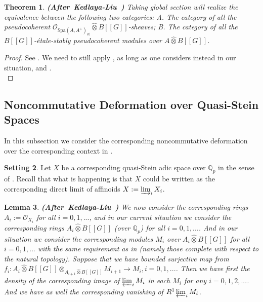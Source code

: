 \documentclass[12pt]{amsart}
\newtheorem{theorem}{Theorem}[section]
\newtheorem{lemma}[theorem]{Lemma}
\theoremstyle{definition}
\numberwithin{equation}{section}
\newtheorem{setting}[theorem]{Setting}
\begin{document}
\begin{theorem}\mbox{\bf{(After Kedlaya-Liu \cite[Theorem 2.5.14]{KL2})}} \label{theorem3.23}
Taking global section will realize the equivalence between the following two categories: A. The category of all the pseudocoherent $\mathcal{O}_{\mathrm{Spa}(A,A^+)_{\text{\'et}}}\widehat{\otimes}B[[G]]$-sheaves; B. The category of all the $B[[G]]$-\'etale-stably pseudocoherent modules over $A\widehat{\otimes}B[[G]]$. 	
\end{theorem}


\begin{proof}
See \cite[Theorem 2.5.14]{KL2}. We need to still apply \cite[Theorem 8.2.22]{KL1}, as long as one considers instead in our situation, and \cite[Tag 03OD]{SP}.\\	
\end{proof}







\subsection{Noncommutative Deformation over Quasi-Stein Spaces}

\indent In this subsection we consider the corresponding noncommutative deformation over the corresponding context in \cite[Chapter 2.6]{KL2}.

\begin{setting}
Let $X$ be a corresponding quasi-Stein adic space over $\mathbb{Q}_p$  in the sense of \cite[Definition 2.6.2]{KL2}. Recall that what is happening is that $X$ could be written as the corresponding direct limit of affinoids $X:=\varinjlim_i X_i$. 	
\end{setting}



\begin{lemma} \mbox{\bf{(After Kedlaya-Liu \cite[Lemma 2.6.3]{KL2})}}
We now consider the corresponding rings $A_i:=\mathcal{O}_{X_i}$ for all $i=0,1,...$, and in our current situation we consider the corresponding rings $A_i\widehat{\otimes}B[[G]]$ (over $\mathbb{Q}_p$) for all $i=0,1,...$. And in our situation we consider the corresponding modules $M_i$ over $A_i\widehat{\otimes}B[[G]]$ for all $i=0,1,...$ with the same requirement as in \cite[Lemma 2.6.3]{KL2} (namely those complete with respect to the natural topology). Suppose that we have bounded surjective map from $f_i:A_{i}\widehat{\otimes}B[[G]]\otimes_{A_{i+1}\widehat{\otimes}B[[G]]} M_{i+1}\rightarrow M_i,i=0,1,...$. Then we have first the density of the corresponding image of $\varprojlim_i M_i$ in each $M_i$ for any $i=0,1,2,...$. And we have as well the corresponding vanishing of $R^1\varprojlim_i M_i$.
\end{lemma}
\end{document}
